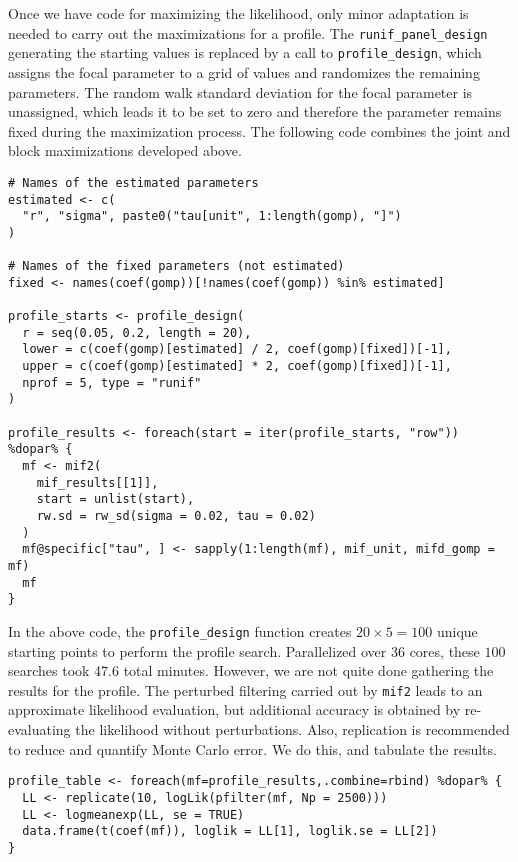 Once we have code for maximizing the likelihood, only minor adaptation is needed to carry out the maximizations for a profile.
The \texttt{runif\_panel\_design} generating the starting values is replaced by a call to \texttt{profile\_design}, which assigns the focal parameter to a grid of values and randomizes the remaining parameters.
The random walk standard deviation for the focal parameter is unassigned, which leads it to be set to zero and therefore the parameter remains fixed during the maximization process.
The following code combines the joint and block maximizations developed above.

\begin{verbatim}
# Names of the estimated parameters
estimated <- c(
  "r", "sigma", paste0("tau[unit", 1:length(gomp), "]")
)

# Names of the fixed parameters (not estimated)
fixed <- names(coef(gomp))[!names(coef(gomp)) %in% estimated]

profile_starts <- profile_design(
  r = seq(0.05, 0.2, length = 20),
  lower = c(coef(gomp)[estimated] / 2, coef(gomp)[fixed])[-1],
  upper = c(coef(gomp)[estimated] * 2, coef(gomp)[fixed])[-1],
  nprof = 5, type = "runif"
)

profile_results <- foreach(start = iter(profile_starts, "row")) %dopar% {
  mf <- mif2(
    mif_results[[1]],
    start = unlist(start),
    rw.sd = rw_sd(sigma = 0.02, tau = 0.02)
  )
  mf@specific["tau", ] <- sapply(1:length(mf), mif_unit, mifd_gomp = mf)
  mf
}
\end{verbatim}

In the above code, the \texttt{profile\_design} function creates \(20 \times 5 = 100\) unique starting points to perform the profile search.
Parallelized over 36 cores, these \(100\) searches took 47.6 total minutes.
However, we are not quite done gathering the results for the profile.
The perturbed filtering carried out by \texttt{mif2} leads to an approximate likelihood evaluation, but additional accuracy is obtained by re-evaluating the likelihood without perturbations.
Also, replication is recommended to reduce and quantify Monte Carlo error.
We do this, and tabulate the results.

\begin{verbatim}
profile_table <- foreach(mf=profile_results,.combine=rbind) %dopar% {
  LL <- replicate(10, logLik(pfilter(mf, Np = 2500)))
  LL <- logmeanexp(LL, se = TRUE)
  data.frame(t(coef(mf)), loglik = LL[1], loglik.se = LL[2])
}
\end{verbatim}

